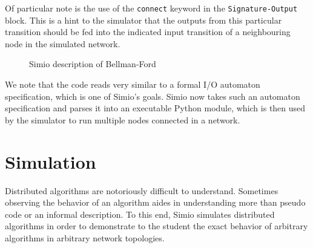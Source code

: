 \documentclass{scrartcl}
\def \kw#1{\texttt{\color{MidnightBlue}#1}}
\def \self {\texttt{\color{Cerulean}self}}
\def \py#1{\texttt{\color{LimeGreen}#1}}
\def \pyval#1{\texttt{\color{Sepia}#1}}
\begin{document}
Of particular note is the use of the \kw{connect} keyword in the
\kw{Signature-Output} block. This is a hint to the simulator that the outputs
from this particular transition should be fed into the indicated input
transition of a neighbouring node in the simulated network.

\begin{figure}
\caption{Simio description of Bellman-Ford}\label{alg:1}
\end{figure}

We note that the code reads very similar to a formal I/O automaton
specification, which is one of Simio's goals. Simio now takes such an automaton
specification and parses it into an executable Python module, which is then
used by the simulator to run multiple nodes connected in a network.

\section{Simulation}\label{sec:sim}

Distributed algorithms are notoriously difficult to understand.
Sometimes observing the behavior of an algorithm aides in understanding more
than pseudo code or an informal description.
To this end, Simio simulates distributed algorithms in order to demonstrate to
the student the exact behavior of arbitrary algorithms in arbitrary network
topologies.
\end{document}
